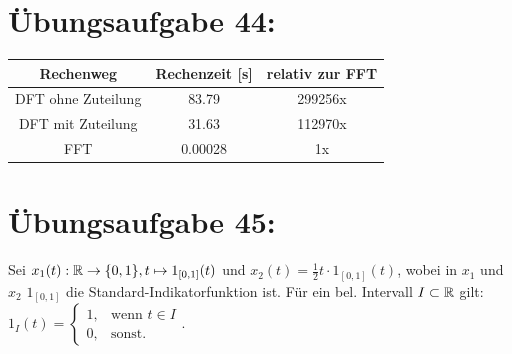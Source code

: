 

	\section*{Übungsaufgabe 44:}

	\begin{tabular}{|c|c|c|}
		\hline
		Rechenweg & Rechenzeit [s] & relativ zur FFT \\ \hline
		DFT ohne Zuteilung & 83.79 & 299256x \\ \hline
		DFT mit Zuteilung & 31.63 & 112970x \\ \hline
		FFT & 0.00028 & 1x \\ \hline
	\end{tabular}
	
\newpage
	\section*{Übungsaufgabe 45:}
		Sei $x_1(t):{\mathbb R} \to \{0,1\}, t\mapsto 1_{[0,1]}(t)$  und $x_2(t) = \frac{1}{2}t\cdot 1_{[0,1]}(t)$, wobei in $x_1$ und $x_2$ $1_{[0,1]}$ die Standard-Indikatorfunktion ist. Für ein bel. Intervall $I\subset{\mathbb R}$  gilt: $1_{I}(t) = \begin{cases} 1, &\text{wenn } t\in I\\ 0, & \text{sonst.}\end{cases}$.
		
